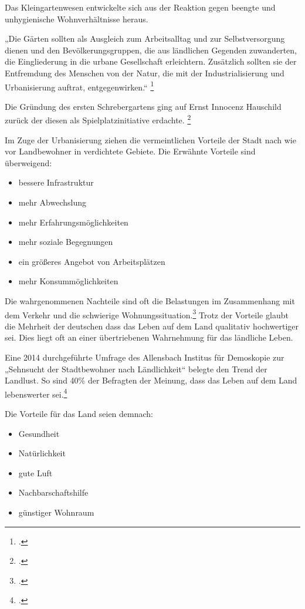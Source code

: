 \documentclass{scrartcl}
\begin{document}
Das Kleingartenwesen entwickelte sich aus der Reaktion gegen beengte und unhygienische Wohnverhältnisse heraus. 

\begin{displayquote}
„Die Gärten sollten als Ausgleich zum Arbeitsalltag und zur Selbstversorgung dienen und den Bevölkerungsgruppen, die aus ländlichen Gegenden zuwanderten, die Eingliederung in die urbane Gesellschaft erleichtern. Zusätzlich sollten sie der Entfremdung des Menschen von der Natur, die mit der Industrialisierung
und Urbanisierung auftrat, entgegenwirken.“ \footcite[Vgl.][S. 38]{Egnolff2015DieIdeal}
\end{displayquote} 

Die Gründung des ersten Schrebergartens ging auf Ernst Innocenz Hauschild zurück der diesen als Spielplatzinitiative erdachte. \footcite[Vgl.][S. 39]{Egnolff2015DieIdeal}

Im Zuge der Urbanisierung ziehen die vermeintlichen Vorteile der Stadt nach wie vor Landbewohner in verdichtete Gebiete. Die Erwähnte Vorteile sind überweigend: 

\begin{itemize}
\item bessere Infrastruktur
\item mehr Abwechslung
\item mehr Erfahrungsmöglichkeiten 
\item mehr soziale Begegnungen
\item ein größeres Angebot von Arbeitsplätzen
\item mehr Konsummöglichkeiten
\end{itemize}

Die wahrgenommenen Nachteile sind oft die Belastungen im Zusammenhang mit dem Verkehr und die schwierige Wohnungssituation.\footcite[S. 41]{Egnolff2015DieIdeal} Trotz der Vorteile glaubt die Mehrheit der deutschen dass das Leben auf dem Land qualitativ hochwertiger sei. Dies liegt oft an einer übertriebenen Wahrnehmung für das ländliche Leben.

Eine 2014 durchgeführte Umfrage des Allensbach Institus für Demoskopie zur „Sehnsucht der Stadtbewohner nach Ländlichkeit“ belegte den Trend der Landlust. So sind 40\% der Befragten der Meinung, dass das Leben auf dem Land lebenswerter sei.\footcite[Vgl.][S. 15 Abb.2]{Dr.ThomasPetersen2014DieLandlichkeit}

Die Vorteile für das Land seien demnach:

\begin{itemize}
    \item Gesundheit
    \item Natürlichkeit
    \item gute Luft
    \item Nachbarschaftshilfe
    \item günstiger Wohnraum
\end{itemize}
\end{document}
